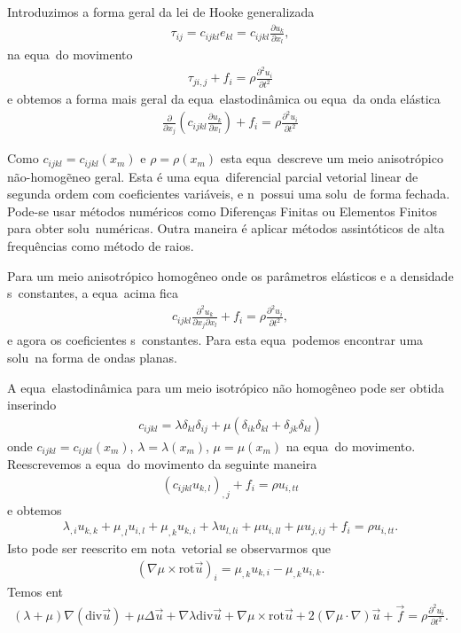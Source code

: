 Introduzimos a forma geral da lei de Hooke generalizada
\begin{eqnarray*}
\tau_{ij} = c_{ijkl}e_{kl} = c_{ijkl}\frac{\partial u_k}{\partial x_l},
\end{eqnarray*}
na equa\cao\ do movimento
\begin{eqnarray*}
\tau_{ji,j} + f_{i} = \rho\frac{\partial^2 u_i}{\partial t^2}
\end{eqnarray*}
e obtemos a forma mais geral da equa\cao\ elastodin\^amica ou equa\cao\
da onda el\'astica
\begin{eqnarray}
\frac{\partial}{\partial x_j}\left(c_{ijkl}\frac{\partial u_k}{\partial x_l}\right) + f_i
= \rho\frac{\partial^2 u_i}{\partial t^2}
\end{eqnarray}

Como $c_{ijkl} = c_{ijkl}(x_m)$ e $\rho = \rho(x_m)$ esta equa\cao\
descreve um meio anisotr\'opico n\~ao-homog\~eneo geral. Esta \'e uma
equa\cao\ diferencial parcial vetorial linear de segunda ordem com
coeficientes vari\'aveis, e n\ao\ possui uma solu\cao\ de forma fechada.
Pode-se usar m\'etodos num\'ericos como Diferen\c{c}as Finitas ou
Elementos Finitos para obter solu\coes\ num\'ericas. Outra maneira \'e
aplicar m\'etodos assint\'oticos de alta frequ\^encias como m\'etodo de
raios.

Para um meio anisotr\'opico homog\^eneo onde os par\^ametros el\'asticos e
a densidade s\ao\ constantes, a equa\cao\ acima fica
\begin{eqnarray}
c_{ijkl}\frac{\partial^2 u_k}{\partial x_j\partial x_l} + f_i = \rho\frac{\partial^2 u_i}{\partial t^2},
\end{eqnarray}
e agora os coeficientes s\ao\ constantes. Para esta equa\cao\ podemos
encontrar uma solu\cao\ na forma de ondas planas.

A equa\cao\
elastodin\^amica para um meio isotr\'opico n\~ao homog\^eneo pode ser
obtida inserindo
\begin{eqnarray}
c_{ijkl} = \lambda\delta_{kl}\delta_{ij} + \mu(\delta_{ik}\delta_{kl} + \delta_{jk}\delta_{kl})
\end{eqnarray}
onde $c_{ijkl} = c_{ijkl}(x_m)$, $\lambda = \lambda(x_m)$, $\mu =
\mu(x_m)$ na equa\cao\ do movimento. Reescrevemos a equa\cao\ do
movimento da seguinte maneira
\begin{eqnarray}
(c_{ijkl}u_{k,l})_{,j} + f_i = \rho u_{i,tt}
\end{eqnarray}
e obtemos
\begin{eqnarray}
\lambda_{,i}u_{k,k} + \mu_{,l}u_{i,l} + \mu_{,k}u_{k,i} + \lambda u_{l,li} + \mu u_{i,ll} + \mu u_{j,ij} + f_i 
= \rho u_{i,tt}.
\label{eqelaiso}
\end{eqnarray}
Isto pode ser reescrito em nota\cao\ vetorial se observarmos que
\begin{eqnarray}
(\nabla\mu\times\mbox{rot}\vec{u})_i = \mu_{,k}u_{k,i} - \mu_{,k}u_{i,k}.
\end{eqnarray}
Temos ent\ao\
\begin{eqnarray}
(\lambda + \mu)\nabla(\mbox{div}\vec{u}) + \mu\Delta\vec{u} + \nabla\lambda\mbox{div}\vec{u} 
+ \nabla\mu\times\mbox{rot}\vec{u} + 2(\nabla\mu\cdot\nabla)\vec{u} + \vec{f} = \rho\frac{\partial^2 u_i}{\partial t^2}.
\end{eqnarray}

